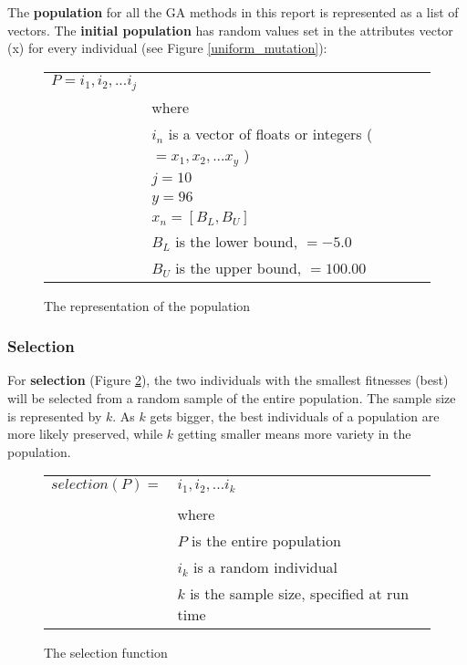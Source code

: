 The \textbf{population} for all the GA methods in this report is represented as a list of vectors. The \textbf{initial population} has random values set in the attributes vector (x) for every individual (see Figure \ref{uniform_mutation}):
\begin{figure}[!h]
	\begin{center}
		\begin{tabular}{r l}
		$ P = i_1, i_2, ... i_j $& \\
					& where \\
					& $ i_n $ is a vector of floats or integers ( $ = x_1, x_2, ... x_y $ ) \\
					& $ j = 10 $ \\
					& $ y = 96 $ \\
					& $ x_n = [B_L, B_U] $ \\
					& $ B_L $ is the lower bound, $ = -5.0$ \\
					& $ B_U $ is the upper bound, $ = 100.00$\\
		\end{tabular} 
               	\caption{The representation of the population}
                \label{population}
        \end{center}
\end{figure}

\subsubsection{Selection}
For \textbf{selection} (Figure \ref{selection}), the two individuals with the smallest fitnesses (best) will be selected from a random sample of the entire population. The sample size is represented by $ k $. As $ k $ gets bigger, the best individuals of a population are more likely preserved, while $ k $ getting smaller means more variety in the population. 
\begin{figure}[!h]
        \begin{center}
		\begin{tabular}{r l}
			$ selection(P) = $ &$ i_1, i_2, ... i_k$ \\
					& \\
					& where \\
					& $ P $ is the entire population \\
					& $ i_k $ is a random individual \\
					& $ k $ is the sample size, specified at run time \\
		\end{tabular} 
               \caption{The selection function}
                \label{selection}
        \end{center}
\end{figure}

